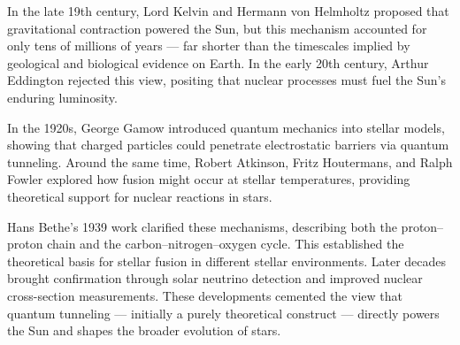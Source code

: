 \begin{historical}
In the late 19th century, Lord Kelvin and Hermann von Helmholtz proposed that gravitational contraction powered the Sun, but this mechanism accounted for only tens of millions of years — far shorter than the timescales implied by geological and biological evidence on Earth. In the early 20th century, Arthur Eddington rejected this view, positing that nuclear processes must fuel the Sun’s enduring luminosity.

In the 1920s, George Gamow introduced quantum mechanics into stellar models, showing that charged particles could penetrate electrostatic barriers via quantum tunneling. Around the same time, Robert Atkinson, Fritz Houtermans, and Ralph Fowler explored how fusion might occur at stellar temperatures, providing theoretical support for nuclear reactions in stars.

Hans Bethe’s 1939 work clarified these mechanisms, describing both the proton–proton chain and the carbon–nitrogen–oxygen cycle. This established the theoretical basis for stellar fusion in different stellar environments. Later decades brought confirmation through solar neutrino detection and improved nuclear cross-section measurements. These developments cemented the view that quantum tunneling — initially a purely theoretical construct — directly powers the Sun and shapes the broader evolution of stars. \end{historical}

